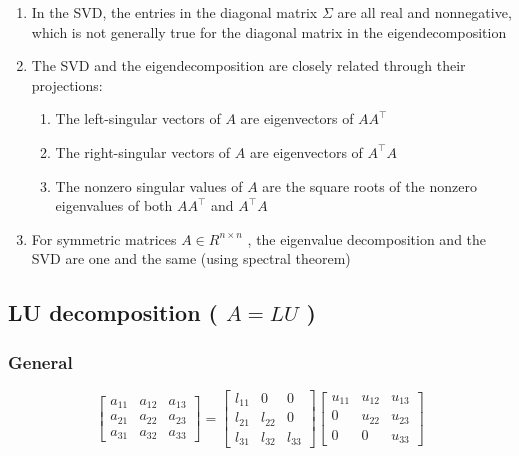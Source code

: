 \begin{enumerate}
    \item In the SVD, the entries in the diagonal matrix $\Sigma$ are all real and nonnegative, which is not generally true for the diagonal matrix in the eigendecomposition

    \item The SVD and the eigendecomposition are closely related through their projections:
    \begin{enumerate}
        \item The left-singular vectors of $A$ are eigenvectors of $AA^\top$ 
    
        \item The right-singular vectors of $A$ are eigenvectors of $A^\top A$
    
        \item The nonzero singular values of $A$ are the square roots of the nonzero eigenvalues of both $AA^\top$  and $A^\top A$
    \end{enumerate}

    \item For symmetric matrices $A \in  R^{n\times n}$ , the eigenvalue decomposition and the SVD are one and the same (using spectral theorem)

\end{enumerate}



\subsection{LU decomposition ( $A = LU$ ) \cite{wiki/LU_decomposition}} \label{LU decomposition}

\subsubsection{General}
\[
    \displaystyle 
    \begin{bmatrix}
        a_{11} & a_{12} & a_{13} \\
        a_{21} & a_{22} & a_{23}\\
        a_{31} & a_{32} & a_{33}
    \end{bmatrix}
    =
    \begin{bmatrix}
        l _{11} & 0 & 0\\
        l _{21} & l _{22} & 0\\
        l _{31} & l _{32} & l _{33}
    \end{bmatrix}
    \begin{bmatrix}
        u_{11} & u_{12} & u_{13}\\
        0 & u_{22} & u_{23}\\
        0 & 0 & u_{33}
    \end{bmatrix}
\]

